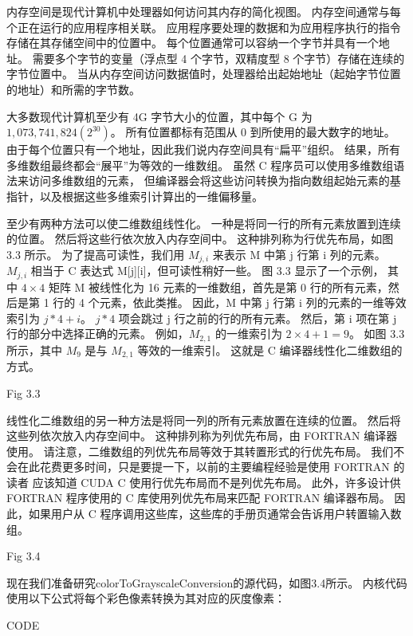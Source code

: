 \begin{remark}[内存空间]
内存空间是现代计算机中处理器如何访问其内存的简化视图。 内存空间通常与每个正在运行的应用程序相关联。 
应用程序要处理的数据和为应用程序执行的指令存储在其存储空间中的位置中。 每个位置通常可以容纳一个字节并具有一个地址。 
需要多个字节的变量（浮点型 4 个字节，双精度型 8 个字节）存储在连续的字节位置中。 
当从内存空间访问数据值时，处理器给出起始地址（起始字节位置的地址）和所需的字节数。

大多数现代计算机至少有 4G 字节大小的位置，其中每个 G 为 $1,073,741,824(2^{30})$。 
所有位置都标有范围从 0 到所使用的最大数字的地址。 由于每个位置只有一个地址，因此我们说内存空间具有“扁平”组织。 
结果，所有多维数组最终都会“展平”为等效的一维数组。 虽然 C 程序员可以使用多维数组语法来访问多维数组的元素，
但编译器会将这些访问转换为指向数组起始元素的基指针，以及根据这些多维索引计算出的一维偏移量。
\end{remark}

至少有两种方法可以使二维数组线性化。 一种是将同一行的所有元素放置到连续的位置。 然后将这些行依次放入内存空间中。 
这种排列称为行优先布局，如图 3.3 所示。 为了提高可读性，我们用 $M_{j,i}$ 来表示 M 中第 j 行第 i 列的元素。 
$M_{j,i}$ 相当于 C 表达式 M[j][i]，但可读性稍好一些。 图 3.3 显示了一个示例，
其中 $4 \times 4$ 矩阵 M 被线性化为 16 元素的一维数组，首先是第 0 行的所有元素，然后是第 1 行的 4 个元素，依此类推。 
因此，M 中第 j 行第 i 列的元素的一维等效索引为 $j * 4 + i$。 $j * 4$ 项会跳过 j 行之前的行的所有元素。 
然后，第 i 项在第 j 行的部分中选择正确的元素。 例如，$M_{2,1}$ 的一维索引为 $2 × 4 + 1 = 9$。
如图 3.3 所示，其中 $M_9$ 是与 $M_{2,1}$ 等效的一维索引。 这就是 C 编译器线性化二维数组的方式。

{\color{red} Fig 3.3}

线性化二维数组的另一种方法是将同一列的所有元素放置在连续的位置。 然后将这些列依次放入内存空间中。 
这种排列称为列优先布局，由 FORTRAN 编译器使用。 请注意，二维数组的列优先布局等效于其转置形式的行优先布局。 
我们不会在此花费更多时间，只是要提一下，以前的主要编程经验是使用 FORTRAN 的读者
应该知道 CUDA C 使用行优先布局而不是列优先布局。 
此外，许多设计供 FORTRAN 程序使用的 C 库使用列优先布局来匹配 FORTRAN 编译器布局。 
因此，如果用户从 C 程序调用这些库，这些库的手册页通常会告诉用户转置输入数组。

{\color{red} Fig 3.4}

现在我们准备研究colorToGrayscaleConversion的源代码，如图3.4所示。 
内核代码使用以下公式将每个彩色像素转换为其对应的灰度像素：

{\color{red} CODE}

